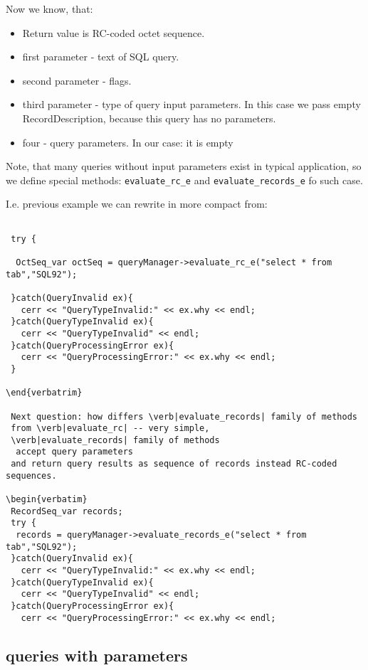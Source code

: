 \documentclass[10pt]{article}
\begin{document}
 Now we know, that:
\begin{itemize}
  \item Return value is RC-coded octet sequence.
  \item first parameter - text of SQL query.
  \item second parameter - flags. 
  \item third parameter - type of query input parameters. In this case we
 pass empty RecordDescription, because this query has no parameters.
  \item  four - query parameters. In our case: it is empty
\end{itemize}

 Note, that many queries without input parameters exist in typical application, so we define special methods: \verb|evaluate_rc_e| and \verb|evaluate_records_e| fo such case.

 I.e. previous example we can rewrite in more compact from:

\begin{verbatim}

 try {

  OctSeq_var octSeq = queryManager->evaluate_rc_e("select * from tab","SQL92");

 }catch(QueryInvalid ex){
   cerr << "QueryTypeInvalid:" << ex.why << endl;
 }catch(QueryTypeInvalid ex){
   cerr << "QueryTypeInvalid" << endl;
 }catch(QueryProcessingError ex){
   cerr << "QueryProcessingError:" << ex.why << endl;
 }

\end{verbatrim}

 Next question: how differs \verb|evaluate_records| family of methods 
 from \verb|evaluate_rc| -- very simple, 
 \verb|evaluate_records| family of methods
  accept query parameters 
 and return query results as sequence of records instead RC-coded sequences.

\begin{verbatim}
 RecordSeq_var records;
 try {
  records = queryManager->evaluate_records_e("select * from tab","SQL92");
 }catch(QueryInvalid ex){
   cerr << "QueryTypeInvalid:" << ex.why << endl;
 }catch(QueryTypeInvalid ex){
   cerr << "QueryTypeInvalid" << endl;
 }catch(QueryProcessingError ex){
   cerr << "QueryProcessingError:" << ex.why << endl;
 \end{verbatim}
 

\subsection{ queries with parameters  }
\end{document}
